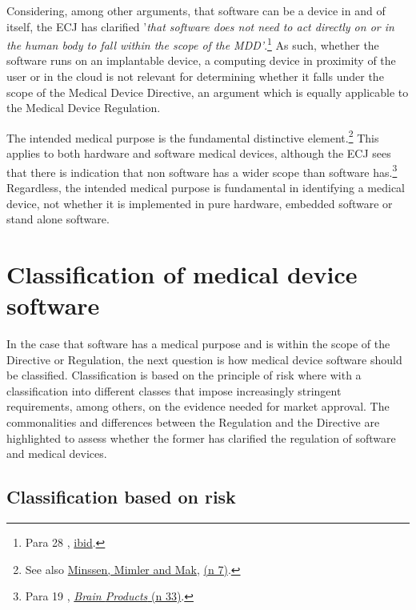 \documentclass[
]{scrartcl}
\begin{document}
Considering, among other arguments, that software can be a device in and of itself, the ECJ has clarified '\emph{that software does not need to act directly on or in the human body to fall within the scope of the MDD'}.\footnote{Para 28 , \protect\hyperlink{ref-SNITEM2017}{ibid}.} As such, whether the software runs on an implantable device, a computing device in proximity of the user or in the cloud is not relevant for determining whether it falls under the scope of the Medical Device Directive, an argument which is equally applicable to the Medical Device Regulation.

The intended medical purpose is the fundamental distinctive element.\footnote{See also \protect\hyperlink{ref-minssenWhenDoesStandAlone2020a}{Minssen, Mimler and Mak}, \protect\hyperlink{ref-minssenWhenDoesStandAlone2020a}{(n 7)}.} This applies to both hardware and software medical devices, although the ECJ sees that there is indication that non software has a wider scope than software has.\footnote{Para 19 , \protect\hyperlink{ref-BrainProducts2012}{\emph{Brain {Products}} (n 33)}.} Regardless, the intended medical purpose is fundamental in identifying a medical device, not whether it is implemented in pure hardware, embedded software or stand alone software.

\hypertarget{sec:Classification-of-medical}{%
\section{Classification of medical device software}\label{sec:Classification-of-medical}}

In the case that software has a medical purpose and is within the scope of the Directive or Regulation, the next question is how medical device software should be classified. Classification is based on the principle of risk where with a classification into different classes that impose increasingly stringent requirements, among others, on the evidence needed for market approval. The commonalities and differences between the Regulation and the Directive are highlighted to assess whether the former has clarified the regulation of software and medical devices.

\hypertarget{classification-based-on-risk}{%
\subsection{Classification based on risk}\label{classification-based-on-risk}}
\end{document}

